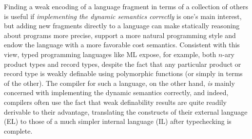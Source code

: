 \documentclass[9pt,preprint]{sigplanconf}
\begin{document}
Finding a weak encoding of a language fragment in terms of a collection of others is useful if \emph{implementing the dynamic semantics correctly} is one's main interest, but adding new fragments directly to a language can make statically reasoning about programs more precise, support a more natural programming style and endow the language with a more favorable cost semantics.  
Consistent with this view, typed programming languages like ML expose, for example, both $n$-ary product types and record types, despite the fact that any particular product or record type is weakly definable using  polymorphic functions (or simply in terms of the other). The compiler for such a language, on the other hand, \emph{is} mainly concerned with implementing the dynamic semantics correctly, and indeed, compilers often use the fact that weak definability results are quite readily derivable to their advantage, translating the constructs of their external language (EL) to those of a much simpler internal language (IL) after typechecking is complete. %
\end{document}
